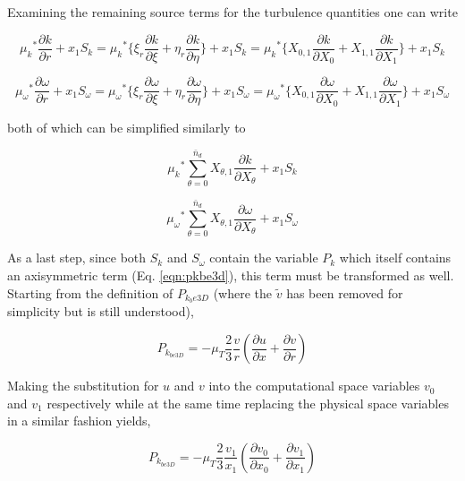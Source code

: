 	Examining the remaining source terms for the turbulence quantities one can write

\begin{displaymath}
	{\mu_k}^* \frac{\partial k}{\partial r} + x_1S_k = {\mu_k}^* \Big\{\xi_r \frac{\partial k}{\partial \xi}
	+\eta_r \frac{\partial k}{\partial \eta}\Big\} + x_1S_k = {\mu_k}^* \Big\{X_{0,1} \frac{\partial k}{\partial X_0}
	+ X_{1,1} \frac{\partial k}{\partial X_1}\Big\} + x_1S_k
\end{displaymath}	

\begin{displaymath}
	{\mu_\omega}^* \frac{\partial \omega}{\partial r} + x_1S_\omega = {\mu_\omega}^* 
	\Big\{\xi_r \frac{\partial \omega}{\partial \xi}
	+\eta_r \frac{\partial \omega}{\partial \eta}\Big\} + x_1S_\omega = {\mu_\omega}^* 
	\Big\{X_{0,1} \frac{\partial \omega}{\partial X_0}
	+ X_{1,1} \frac{\partial \omega}{\partial X_1}\Big\} + x_1S_\omega
\end{displaymath}	

	both of which can be simplified similarly to

\begin{equation}
	{\mu_k}^*\sum_{\theta = 0}^{\bar{n}_d}X_{\theta,1}\frac{\partial k}{\partial X_\theta} + x_1S_k
\label{eqn:kcomp}
\end{equation}

\begin{equation}
	{\mu_\omega}^*\sum_{\theta = 0}^{\bar{n}_d}X_{\theta,1}\frac{\partial \omega}{\partial X_\theta} + x_1S_\omega
\label{eqn:omegacomp}
\end{equation}

	As a last step, since both $S_k$ and $S_\omega$ contain the variable $P_k$ which itself contains an axisymmetric
term (Eq. \ref{eqn:pkbe3d}), this term must be transformed as well.  Starting from the definition of $P_{k_be3D}$ (where
the $\tilde v$ has been removed for simplicity but is still understood),

\begin{displaymath}
	P_{k_{be3D}} = -\mu_T\frac{2}{3}\frac{v}{r}(\frac{\partial u}{\partial x} + \frac{\partial v}{\partial r})
\end{displaymath}

	Making the substitution for $u$ and $v$ into the computational space variables $v_0$ and $v_1$ respectively while at the 
same time replacing the physical space variables in a similar fashion yields,

\begin{displaymath}
	P_{k_{be3D}} = -\mu_T\frac{2}{3}\frac{v_1}{x_1}(\frac{\partial v_0}{\partial x_0} + \frac{\partial v_1}{\partial x_1})
\end{displaymath}

